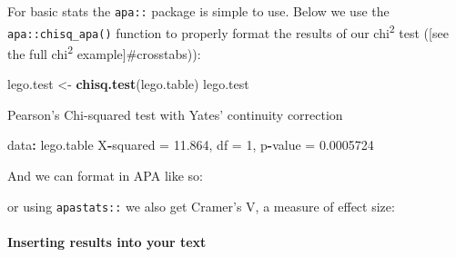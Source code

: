 \documentclass[]{article}
\newenvironment{Shaded}{\begin{snugshade}}{\end{snugshade}}
\newcommand{\CharTok}[1]{\textcolor[rgb]{0.31,0.60,0.02}{#1}}
\newcommand{\DataTypeTok}[1]{\textcolor[rgb]{0.13,0.29,0.53}{#1}}
\newcommand{\DecValTok}[1]{\textcolor[rgb]{0.00,0.00,0.81}{#1}}
\newcommand{\FloatTok}[1]{\textcolor[rgb]{0.00,0.00,0.81}{#1}}
\newcommand{\KeywordTok}[1]{\textcolor[rgb]{0.13,0.29,0.53}{\textbf{#1}}}
\newcommand{\NormalTok}[1]{#1}
\newcommand{\OperatorTok}[1]{\textcolor[rgb]{0.81,0.36,0.00}{\textbf{#1}}}
\newcommand{\StringTok}[1]{\textcolor[rgb]{0.31,0.60,0.02}{#1}}
\let\oldparagraph\paragraph
\renewcommand{\paragraph}[1]{\oldparagraph{#1}\mbox{}}
\begin{document}
For basic stats the \texttt{apa::} package is simple to use. Below we use the
\texttt{apa::chisq\_apa()} function to properly format the results of our chi\textsuperscript{2} test
({[}see the full chi\textsuperscript{2} example{]}\#crosstabs)):

\begin{Shaded}
\begin{Highlighting}[]
\NormalTok{lego.test <-}\StringTok{ }\KeywordTok{chisq.test}\NormalTok{(lego.table)}
\NormalTok{lego.test}

\NormalTok{    Pearson}\StringTok{'s Chi-squared test with Yates'}\NormalTok{ continuity correction}

\NormalTok{data}\OperatorTok{:}\StringTok{  }\NormalTok{lego.table}
\NormalTok{X}\OperatorTok{-}\NormalTok{squared =}\StringTok{ }\FloatTok{11.864}\NormalTok{, df =}\StringTok{ }\DecValTok{1}\NormalTok{, p}\OperatorTok{-}\NormalTok{value =}\StringTok{ }\FloatTok{0.0005724}
\end{Highlighting}
\end{Shaded}

And we can format in APA like so:

\begin{Shaded}
\end{Shaded}

or using \texttt{apastats::} we also get Cramer's V, a measure of effect size:

\begin{Shaded}
\end{Shaded}

\hypertarget{inline-apa-format}{%
\paragraph{Inserting results into your text}\label{inline-apa-format}}
\end{document}
